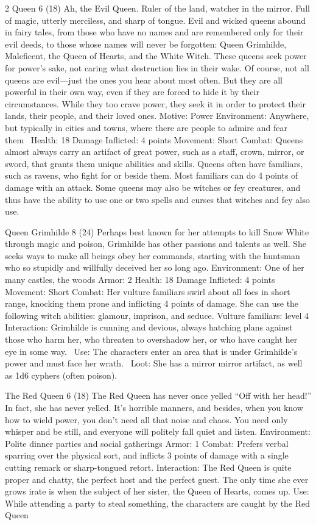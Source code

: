 \begin{multicols}{2}
Queen 6 (18)
Ah, the Evil Queen. Ruler of the land, watcher in the mirror. Full of magic, utterly merciless, and sharp of tongue. Evil and wicked queens abound in fairy tales, from those who have no names and are remembered only for their evil deeds, to those whose names will never be forgotten: Queen Grimhilde, Maleficent, the Queen of Hearts, and the White Witch. These queens seek power for power’s sake, not caring what destruction lies in their wake.
Of course, not all queens are evil—just the ones you hear about most often. But they are all powerful in their own way, even if they are forced to hide it by their circumstances. While they too crave power, they seek it in order to protect their lands, their people, and their loved ones.
Motive: Power
Environment: Anywhere, but typically in cities and towns, where there are people to admire
and fear them 
Health: 18
Damage Inflicted: 4 points
Movement: Short
Combat: Queens almost always carry an artifact of great power, such as a staff, crown,
mirror, or sword, that grants them unique abilities and skills.
Queens often have familiars, such as ravens, who fight for or beside them. Most familiars can do 4 points of damage with an attack.
Some queens may also be witches or fey creatures, and thus have the ability to use one or two spells and curses that witches and fey also use.

Queen Grimhilde 8 (24)
Perhaps best known for her attempts to kill Snow White through magic and poison, Grimhilde has other passions and talents as well. She seeks ways to make all beings obey her commands, starting with the huntsman who so stupidly and willfully deceived her so long ago.
Environment: One of her many castles, the woods
Armor: 2
Health: 18
Damage Inflicted: 4 points
Movement: Short
Combat: Her vulture familiars swirl about all foes in short range, knocking them prone
and inflicting 4 points of damage. She can use the following witch abilities: glamour,
imprison, and seduce.
	Vulture familiars: level 4
Interaction: Grimhilde is cunning and devious, always hatching plans against those who
harm her, who threaten to overshadow her, or who have caught her eye in some way. 
Use: The characters enter an area that is under Grimhilde’s power and must face her wrath. 
Loot: She has a mirror mirror artifact, as well as 1d6 cyphers (often poison).

The Red Queen 6 (18)
The Red Queen has never once yelled “Off with her head!” In fact, she has never yelled. It’s horrible manners, and besides, when you know how to wield power, you don’t need all that noise and chaos. You need only whisper and be still, and everyone will politely fall quiet and listen.
Environment: Polite dinner parties and social gatherings
Armor: 1
Combat: Prefers verbal sparring over the physical sort, and inflicts 3 points of damage with a single cutting remark or sharp-tongued retort.
Interaction: The Red Queen is quite proper and chatty, the perfect host and the perfect guest. The only time she ever grows irate is when the subject of her sister, the Queen of Hearts, comes up.
Use: While attending a party to steal something, the characters are caught by the Red Queen


\end{multicols}
